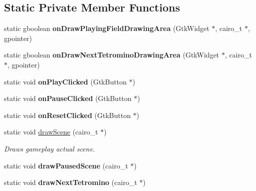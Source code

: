 \subsection*{Static Private Member Functions}
\begin{DoxyCompactItemize}
\item 
\mbox{\label{classTetreesUI_a829fc73fdc1f45fb567168f2c37ab012}} 
static gboolean {\bfseries on\+Draw\+Playing\+Field\+Drawing\+Area} (Gtk\+Widget $\ast$, cairo\+\_\+t $\ast$, gpointer)
\item 
\mbox{\label{classTetreesUI_aa775d6f3e3ca5c11ec3bb73e8dd7f62d}} 
static gboolean {\bfseries on\+Draw\+Next\+Tetromino\+Drawing\+Area} (Gtk\+Widget $\ast$, cairo\+\_\+t $\ast$, gpointer)
\item 
\mbox{\label{classTetreesUI_a9d2b1a8025a16aac4097850deedadd18}} 
static void {\bfseries on\+Play\+Clicked} (Gtk\+Button $\ast$)
\item 
\mbox{\label{classTetreesUI_afe0ff659354e4c6dfe6a7f2fce3ad0de}} 
static void {\bfseries on\+Pause\+Clicked} (Gtk\+Button $\ast$)
\item 
\mbox{\label{classTetreesUI_af80a44c26a4ce356e1f999c8a341197c}} 
static void {\bfseries on\+Reset\+Clicked} (Gtk\+Button $\ast$)
\item 
static void \mbox{\hyperlink{classTetreesUI_a357ae7240cc5f35b5d61244e7a6bcfe3}{draw\+Scene}} (cairo\+\_\+t $\ast$)
\begin{DoxyCompactList}\small\item\em Draws gameplay actual scene. \end{DoxyCompactList}\item 
\mbox{\label{classTetreesUI_a7d39f8caa75f5e755e3cebb0e05bb779}} 
static void {\bfseries draw\+Paused\+Scene} (cairo\+\_\+t $\ast$)
\item 
\mbox{\label{classTetreesUI_a9f4fa68c99e9d6146d9bdf2baa9db4d6}} 
static void {\bfseries draw\+Next\+Tetromino} (cairo\+\_\+t $\ast$)
\item 
\mbox{\label{classTetreesUI_a4d16e60b9a27bfbc2aac1deba09cc74c}} 

\end{DoxyCompactItemize}
